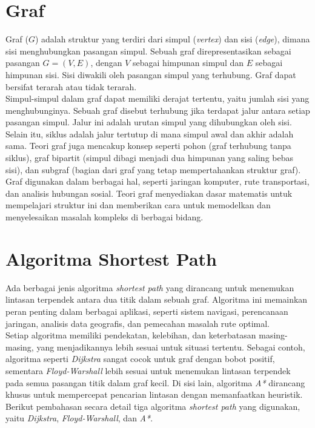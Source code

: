\section{Graf ~\cite{Diestel:17:graph}}
\label{sec:graph}
Graf ($G$) adalah struktur yang terdiri dari simpul (\textit{vertex}) dan sisi (\textit{edge}), dimana sisi menghubungkan pasangan simpul. Sebuah graf direpresentasikan sebagai pasangan $G=(V,E)$, dengan $V$ sebagai himpunan simpul dan $E$ sebagai himpunan sisi. Sisi diwakili oleh pasangan simpul yang terhubung. Graf dapat bersifat terarah atau tidak terarah.
\\
Simpul-simpul dalam graf dapat memiliki derajat tertentu, yaitu jumlah sisi yang menghubunginya. Sebuah graf disebut terhubung jika terdapat jalur antara setiap pasangan simpul. Jalur ini adalah urutan simpul yang dihubungkan oleh sisi. Selain itu, siklus adalah jalur tertutup di mana simpul awal dan akhir adalah sama. Teori graf juga mencakup konsep seperti pohon (graf terhubung tanpa siklus), graf bipartit (simpul dibagi menjadi dua himpunan yang saling bebas sisi), dan subgraf (bagian dari graf yang tetap mempertahankan struktur graf).
\\
Graf digunakan dalam berbagai hal, seperti jaringan komputer, rute transportasi, dan analisis hubungan sosial. Teori graf menyediakan dasar matematis untuk mempelajari struktur ini dan memberikan cara untuk memodelkan dan menyelesaikan masalah kompleks di berbagai bidang. 

\section{Algoritma Shortest Path}
\label{sec:algoritmasp}
Ada berbagai jenis algoritma \textit{shortest path} yang dirancang untuk menemukan lintasan terpendek antara dua titik dalam sebuah graf. Algoritma ini memainkan peran penting dalam berbagai aplikasi, seperti sistem navigasi, perencanaan jaringan, analisis data geografis, dan pemecahan masalah rute optimal.
\\
Setiap algoritma memiliki pendekatan, kelebihan, dan keterbatasan masing-masing, yang menjadikannya lebih sesuai untuk situasi tertentu. Sebagai contoh, algoritma seperti \textit{Dijkstra} sangat cocok untuk graf dengan bobot positif, sementara \textit{Floyd-Warshall} lebih sesuai untuk menemukan lintasan terpendek pada semua pasangan titik dalam graf kecil. Di sisi lain, algoritma \textit{A*} dirancang khusus untuk mempercepat pencarian lintasan dengan memanfaatkan heuristik. Berikut pembahasan secara detail tiga algoritma \textit{shortest path} yang digunakan, yaitu \textit{Dijkstra}, \textit{Floyd-Warshall}, dan \textit{A*}.

